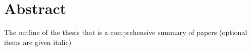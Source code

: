 
\chapter*{Abstract}

The outline of the thesis that is a comprehensive summary of papers 
(optional items are given italic)

